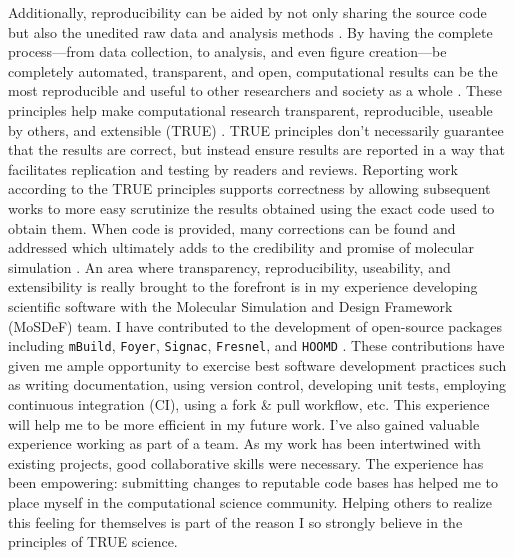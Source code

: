 Additionally, reproducibility can be aided by not only sharing the source code but also the unedited raw data and analysis methods \cite{Miyakawa2020}. 
By having the complete process---from data collection, to analysis, and even figure creation---be completely automated, transparent, and open, computational results can be the most reproducible and useful to other researchers and society as a whole \cite{Taylor2019, Donoho2009}.
These principles help make computational research transparent, reproducible, useable by others, and extensible (TRUE) \cite{Thompson2020}.
TRUE principles don't necessarily guarantee that the results are correct, but instead ensure results are reported in a way that facilitates replication and testing by readers and reviews.
Reporting work according to the TRUE principles supports correctness by allowing subsequent works to more easy scrutinize the results obtained using the exact code used to obtain them.
When code is provided, many corrections can be found and addressed which ultimately adds to the credibility and promise of molecular simulation \cite{superwater}.
An area where transparency, reproducibility, useability, and extensibility is really brought to the forefront is in my experience developing scientific software with the Molecular Simulation and Design Framework (MoSDeF) team.
I have contributed to the development of open-source packages including \texttt{mBuild}, \texttt{Foyer}, \texttt{Signac}, \texttt{Fresnel}, and \texttt{HOOMD} \cite{mbuild, foyer, signac, fresnel, hoomd}.
These contributions have given me ample opportunity to exercise best software development practices such as writing documentation, using version control, developing unit tests, employing continuous integration (CI), using a fork \& pull workflow, etc.
This experience will help me to be more efficient in my future work.
I've also gained valuable experience working as part of a team.
As my work has been intertwined with existing projects, good collaborative skills were necessary.
The experience has been empowering: submitting changes to reputable code bases has helped me to place myself in the computational science community.
Helping others to realize this feeling for themselves is part of the reason I so strongly believe in the principles of TRUE science.

